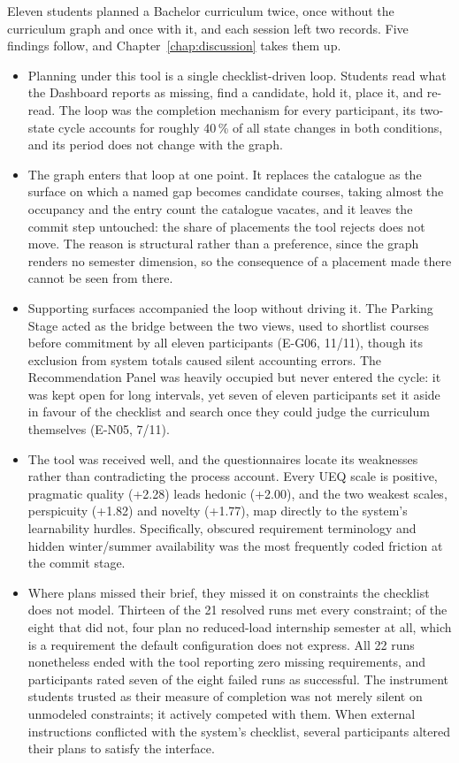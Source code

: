 Eleven students planned a Bachelor curriculum twice, once without the curriculum graph and once with it, and each session left two records. Five findings follow, and Chapter~\ref{chap:discussion} takes them up.
\begin{itemize}
\item Planning under this tool is a single checklist-driven loop. Students read what the Dashboard reports as missing, find a candidate, hold it, place it, and re-read. The loop was the completion mechanism for every participant, its two-state cycle accounts for roughly 40\,\% of all state changes in both conditions, and its period does not change with the graph.

\item The graph enters that loop at one point. It replaces the catalogue as the surface on which a named gap becomes candidate courses, taking almost the occupancy and the entry count the catalogue vacates, and it leaves the commit step untouched: the share of placements the tool rejects does not move. The reason is structural rather than a preference, since the graph renders no semester dimension, so the consequence of a placement made there cannot be seen from there.

\item Supporting surfaces accompanied the loop without driving it. The Parking Stage acted as the bridge between the two views, used to shortlist courses before commitment by all eleven participants (E-G06, 11/11), though its exclusion from system totals caused silent accounting errors. The Recommendation Panel was heavily occupied but never entered the cycle: it was kept open for long intervals, yet seven of eleven participants set it aside in favour of the checklist and search once they could judge the curriculum themselves (E-N05, 7/11).

\item The tool was received well, and the questionnaires locate its weaknesses rather than contradicting the process account. Every UEQ scale is positive, pragmatic quality (+2.28) leads hedonic (+2.00), and the two weakest scales, perspicuity (+1.82) and novelty (+1.77), map directly to the system's learnability hurdles. Specifically, obscured requirement terminology and hidden winter/summer availability was the most frequently coded friction at the commit stage.

\item Where plans missed their brief, they missed it on constraints the checklist does not model. Thirteen of the 21 resolved runs met every constraint; of the eight that did not, four plan no reduced-load internship semester at all, which is a requirement the default configuration does not express. All 22 runs nonetheless ended with the tool reporting zero missing requirements, and participants rated seven of the eight failed runs as successful. The instrument students trusted as their measure of completion was not merely silent on unmodeled constraints; it actively competed with them. When external instructions conflicted with the system's checklist, several participants altered their plans to satisfy the interface.
\end{itemize}

